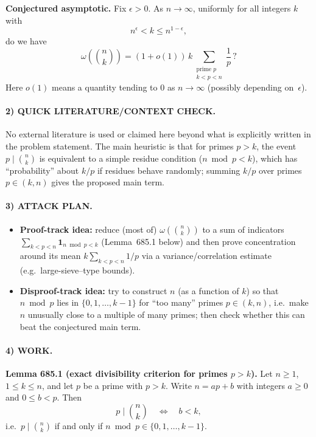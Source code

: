 \medskip
\noindent\textbf{Conjectured asymptotic.}
Fix $\epsilon>0$. As $n\to\infty$, uniformly for all integers $k$ with
\[
n^\epsilon<k\le n^{1-\epsilon},
\]
do we have
\[
\omega\!\left(\binom{n}{k}\right)
=(1+o(1))\,k\sum_{\substack{\text{prime }p\\ k<p<n}}\frac1p\,?
\]
Here $o(1)$ means a quantity tending to $0$ as $n\to\infty$ (possibly depending on~$\epsilon$).

\paragraph{2) QUICK LITERATURE/CONTEXT CHECK.}
No external literature is used or claimed here beyond what is explicitly written in the problem statement.
The main heuristic is that for primes $p>k$, the event $p\mid \binom{n}{k}$ is equivalent to a simple residue condition
($n\bmod p<k$), which has ``probability'' about $k/p$ if residues behave randomly; summing $k/p$
over primes $p\in(k,n)$ gives the proposed main term.

\paragraph{3) ATTACK PLAN.}
\begin{itemize}
\item \textbf{Proof-track idea:} reduce (most of) $\omega(\binom{n}{k})$ to a sum of indicators
$\sum_{k<p<n}\mathbf 1_{n\bmod p<k}$ (Lemma~685.1 below) and then prove concentration around its mean
$k\sum_{k<p<n}1/p$ via a variance/correlation estimate (e.g.\ large-sieve--type bounds).
\item \textbf{Disproof-track idea:} try to construct $n$ (as a function of $k$) so that $n\bmod p$ lies in $\{0,1,\dots,k-1\}$
for ``too many'' primes $p\in(k,n)$, i.e.\ make $n$ unusually close to a multiple of many primes; then check whether this can beat the
conjectured main term.
\end{itemize}

\paragraph{4) WORK.}
\medskip
\noindent\textbf{Lemma 685.1 (exact divisibility criterion for primes $p>k$).}
Let $n\ge 1$, $1\le k\le n$, and let $p$ be a prime with $p>k$.
Write $n=ap+b$ with integers $a\ge 0$ and $0\le b<p$. Then
\[
p\mid \binom{n}{k}\quad\Longleftrightarrow\quad b<k,
\]
i.e.\ $p\mid \binom{n}{k}$ if and only if $n\bmod p\in\{0,1,\dots,k-1\}$.


